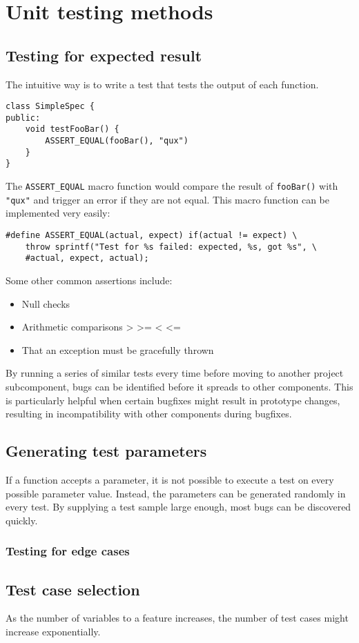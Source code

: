 \section{Unit testing methods}
\subsection{Testing for expected result}
The intuitive way is to write a test that tests the output of each function.

\begin{lstlisting}[style=Cpp]
class SimpleSpec {
public:
	void testFooBar() {
		ASSERT_EQUAL(fooBar(), "qux")
	}
}
\end{lstlisting}

The \texttt{ASSERT\_EQUAL} macro function would compare the result of \texttt{fooBar()} with \texttt{"qux"} and trigger an error if they are not equal.
This macro function can be implemented very easily:

\begin{lstlisting}[style=Cpp]
#define ASSERT_EQUAL(actual, expect) if(actual != expect) \
	throw sprintf("Test for %s failed: expected, %s, got %s", \
	#actual, expect, actual);
\end{lstlisting}

Some other common assertions include:
\begin{itemize}
	\item Null checks
	\item Arithmetic comparisons > >= < <=
	\item That an exception must be gracefully thrown
\end{itemize}

By running a series of similar tests every time before moving to another project subcomponent,
bugs can be identified before it spreads to other components.
This is particularly helpful when certain bugfixes might result in prototype changes,
resulting in incompatibility with other components during bugfixes.

\subsection{Generating test parameters}
If a function accepts a parameter, it is not possible to execute a test on every possible parameter value.
Instead, the parameters can be generated randomly in every test.
By supplying a test sample large enough, most bugs can be discovered quickly.


\subsubsection{Testing for edge cases}

\subsection{Test case selection}
As the number of variables to a feature increases, the number of test cases might increase exponentially.


